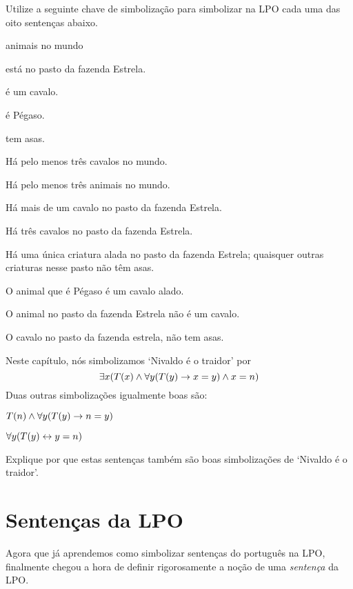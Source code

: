 \problempart Utilize a seguinte chave de simbolização para simbolizar na LPO cada uma das oito sentenças abaixo.
\begin{center}
\begin{ekey}
\item[\text{domínio}] animais no mundo
\item[\atom{E}{x}]  está no pasto da fazenda Estrela.
\item[\atom{C}{x}]  é um cavalo.
\item[\atom{P}{x}]  é Pégaso.
\item[\atom{A}{x}]  tem asas.
\end{ekey}
\end{center}
\begin{earg}
\item Há pelo menos três cavalos no mundo.
\item Há pelo menos três animais no mundo.
\item Há mais de um cavalo no pasto da fazenda Estrela.
\item Há três cavalos no pasto da fazenda Estrela.
\item Há uma única criatura alada no pasto da fazenda Estrela; quaisquer outras criaturas nesse pasto não têm asas.
\item O animal que é Pégaso é um cavalo alado.
\item O animal no pasto da fazenda Estrela não é um cavalo.
\item O cavalo no pasto da fazenda estrela, não tem asas.
\end{earg}

\problempart
Neste capítulo, nós simbolizamos `Nivaldo é o traidor' por
$$\exists x (\mathord{T}(x) \wedge \forall y(\mathord{T}(y) \rightarrow x = y) \wedge x = n)$$
Duas outras simbolizações igualmente boas são:
	\begin{ebullet}
		\item $\mathord{T}(n) \wedge \forall y(\mathord{T}(y) \rightarrow n = y)$
		\item $\forall y(\mathord{T}(y) \leftrightarrow y = n)$
	\end{ebullet}
Explique por que estas sentenças também são boas simbolizações de `Nivaldo é o traidor'.


\chapter{Sentenças da LPO}\label{s:FOLSentences}
Agora que já aprendemos como simbolizar sentenças do português na LPO, finalmente  chegou a hora de definir rigorosamente a noção de uma \emph{sentença} da LPO.

